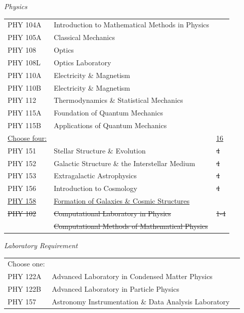 \documentclass[10pt]{article}
\makeatletter
\newcommand{\del}[1]{{\color{red}\sout{#1}}}
\newcommand{\ins}[1]{{\color{red}\uline{#1}}}
\newcommand{\hdr}[1]{\par\medskip{\bfseries #1}\par}
\newenvironment{reqs}{\begin{longtable}{@{\hspace{1em}}p{1.7in}p{3.45in}>{\raggedleft\arraybackslash}p{0.9in}@{}}}{\end{longtable}}
\makeatother
\begin{document}
\hdr{Depth Subject Matter}
\textit{Physics}
\begin{reqs}
PHY 104A & Introduction to Mathematical Methods in Physics & 4\\
PHY 105A & Classical Mechanics & 4\\
PHY 108 & Optics & 3\\
PHY 108L & Optics Laboratory & 1\\
PHY 110A & Electricity \& Magnetism & 4\\
PHY 110B & Electricity \& Magnetism & 4\\
PHY 112 & Thermodynamics \& Statistical Mechanics & 4\\
PHY 115A & Foundation of Quantum Mechanics & 4\\
PHY 115B & Applications of Quantum Mechanics & 4\\
\ins{Choose four:} & & \ins{16}\\
PHY 151 & Stellar Structure \& Evolution & \del{4}\\
PHY 152 & Galactic Structure \& the Interstellar Medium & \del{4}\\
PHY 153 & Extragalactic Astrophysics & \del{4}\\
PHY 156 & Introduction to Cosmology & \del{4}\\
\ins{PHY 158} & \ins{Formation of Galaxies \& Cosmic Structures} & \\
\del{PHY 102} & \del{Computational Laboratory in Physics} & \del{1-4}\\
\quad \del{or PHY 104B} & \del{Computational Methods of Mathematical Physics} & \\
\end{reqs}

\textit{Laboratory Requirement}
\begin{reqs}
Choose one: & & 4\\
PHY 122A & Advanced Laboratory in Condensed Matter Physics & \\
PHY 122B & Advanced Laboratory in Particle Physics & \\
PHY 157 & Astronomy Instrumentation \& Data Analysis Laboratory & \\
\end{reqs}
\end{document}
